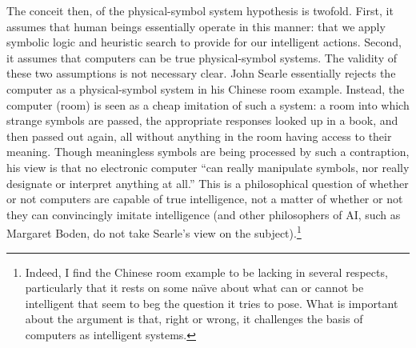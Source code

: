 The conceit then, of the physical-symbol system hypothesis is twofold.
First, it assumes that
human beings essentially operate in this manner: that we apply
symbolic logic and heuristic search to provide for our intelligent
actions. Second, it assumes that computers can be true physical-symbol
systems. The validity of these two assumptions is not necessary clear. John Searle
essentially rejects the computer as a physical-symbol system in his
Chinese room example. Instead, the computer (room) is seen as a cheap
imitation of such a system: a room into which strange symbols are
passed, the appropriate responses looked up in a book,
and then passed out again, all without anything in the room having
access to their meaning.\cite{chineseSearle} Though meaningless
symbols are being processed by such a contraption, his view is that no
electronic computer ``can really manipulate symbols, nor really
designate or interpret anything at all.''\cite{escapingBoden} This is
a philosophical question of whether or not computers are capable of
true intelligence, not a matter of whether or not they can
convincingly imitate intelligence (and other philosophers of AI, such
as Margaret Boden, do not take Searle's view on the
subject).\footnote{Indeed, I find the Chinese room example to be
  lacking in several respects, particularly that it rests on some
  na\"{\i}ve about what can or cannot be intelligent that seem to beg
  the question it tries to pose. What is important about the
  argument is that, right or wrong, it challenges the basis of
  computers as intelligent systems.}

